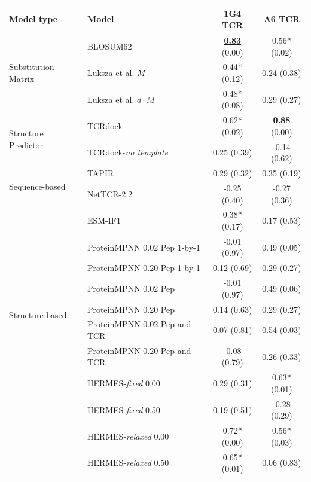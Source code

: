 \begin{table}[ht]
\centering
\begin{tabular}{l l c c}
\hline
Model type & Model & 1G4 TCR & A6 TCR \\
\hline \hline
\multirow{3}{*}{Substitution Matrix} & BLOSUM62 & {\bf\underline{0.83}} \scriptsize{(0.00)} & 0.56*
\scriptsize{(0.02)} \\
& Luksza et al. $M$ & 0.44* \scriptsize{(0.12)} & 0.24 \scriptsize{(0.38)} \\
& Luksza et al. $d \cdot M$ & 0.48* \scriptsize{(0.08)} & 0.29 \scriptsize{(0.27)} \\
\hline
\multirow{2}{*}{Structure Predictor} & TCRdock & 0.62* \scriptsize{(0.02)} & {\bf\underline{0.88}}
\scriptsize{(0.00)} \\
 & TCRdock-{\em no template} & 0.25 \scriptsize{(0.39)} & -0.14 \scriptsize{(0.62)} \\
\hline
 \multirow{2}{*}{Sequence-based} &TAPIR &  0.29 \scriptsize{(0.32)} & 0.35 \scriptsize{(0.19)} \\
 & NetTCR-2.2 & -0.25 \scriptsize{(0.40)} & -0.27 \scriptsize{(0.36)} \\
\hline
\multirow{9}{*}{Structure-based} & ESM-IF1 & 0.38* \scriptsize{(0.17)} & 0.17 \scriptsize{(0.53)} \\
& ProteinMPNN 0.02 Pep 1-by-1 & -0.01 \scriptsize{(0.97)} & 0.49 \scriptsize{(0.05)} \\
 & ProteinMPNN 0.20 Pep 1-by-1 & 0.12 \scriptsize{(0.69)} & 0.29 \scriptsize{(0.27)} \\
& ProteinMPNN 0.02 Pep  & -0.01 \scriptsize{(0.97)} & 0.49 \scriptsize{(0.06)} \\
 & ProteinMPNN 0.20 Pep & 0.14 \scriptsize{(0.63)} & 0.29 \scriptsize{(0.27)} \\
 & ProteinMPNN 0.02 Pep and TCR & 0.07 \scriptsize{(0.81)} & 0.54 \scriptsize{(0.03)} \\
 & ProteinMPNN 0.20 Pep and TCR & -0.08 \scriptsize{(0.79)} & 0.26 \scriptsize{(0.33)} \\
\hline
 \multirow{6}{*}{Structure-based} & HERMES-{\em fixed} 0.00 & 0.29 \scriptsize{(0.31)} & 0.63*
 \scriptsize{(0.01)} \\
 & HERMES-{\em fixed} 0.50 & 0.19 \scriptsize{(0.51)} & -0.28 \scriptsize{(0.29)} \\
 & HERMES-{\em relaxed} 0.00 & 0.72* \scriptsize{(0.00)} & 0.56* \scriptsize{(0.03)} \\
 & HERMES-{\em relaxed} 0.50 & 0.65* \scriptsize{(0.01)} & 0.06 \scriptsize{(0.83)} \\

\end{tabular}
\end{table}
